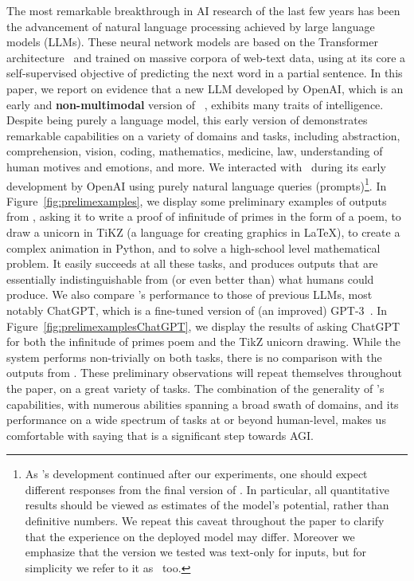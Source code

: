     The most remarkable breakthrough in AI research of the last few years has been the advancement of natural language processing achieved by large language models (LLMs). These neural network models are based on the Transformer architecture~\cite{Vas17} and trained on massive corpora of web-text data, using at its core a self-supervised objective of predicting the next word in a partial sentence.
    In this paper, we report on evidence that a new LLM developed by OpenAI, which is an early and \textbf{non-multimodal} version of \DV\ \cite{gpt4}, exhibits many traits of intelligence.
    Despite being purely a language model, this early version of {\DV} demonstrates remarkable capabilities on a variety of domains and tasks, including abstraction, comprehension, vision, coding, mathematics, medicine, law, understanding of human motives and emotions, and more. 
    We interacted with \DV\ during its early development by OpenAI using purely natural language queries (prompts)\footnote{As \DV’s development continued after our experiments, one should expect different responses from the final version of \DV. In particular, all quantitative results should be viewed as estimates of the model’s potential, rather than definitive numbers. We repeat this caveat throughout the paper to clarify that the experience on the deployed model may differ. Moreover we emphasize that the version we tested was text-only for inputs, but for simplicity we refer to it as \DV\ too.}.
    In Figure~\ref{fig:prelimexamples}, we display some preliminary examples of outputs from {\DV}, asking it to write a proof of infinitude of primes in the form of a poem, to draw a unicorn in TiKZ (a language for creating graphics in \LaTeX), to create a complex animation in Python, and to solve a high-school level mathematical problem. It easily succeeds at all these tasks, and produces outputs that are essentially indistinguishable from (or even better than) what humans could produce. We 
    also compare \DV's performance to those of previous LLMs, most notably ChatGPT, which is a fine-tuned version of (an improved) GPT-3~\cite{gpt3}. In Figure~\ref{fig:prelimexamplesChatGPT}, we display the results of asking ChatGPT for both the infinitude of primes poem and the TikZ unicorn drawing. While the system performs non-trivially on both tasks, there is no comparison with the outputs from \DV. These preliminary observations will repeat themselves throughout the paper, on a great variety of tasks. The combination of the generality of \DV's capabilities, with numerous abilities spanning a broad swath of domains, and its performance on a wide spectrum of tasks at or beyond human-level, makes us comfortable %
    with saying that {\DV} is a significant step towards AGI.
    \newline
    
